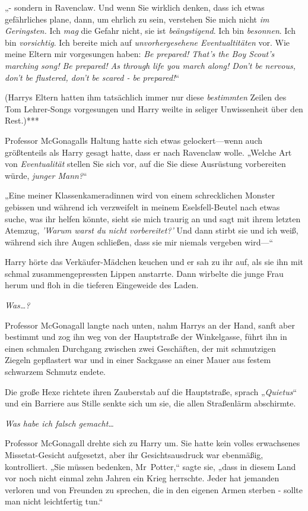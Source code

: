 {„- sondern in Ravenclaw. Und wenn Sie wirklich denken, dass ich etwas gefährliches plane, dann, um ehrlich zu sein, verstehen Sie mich nicht \emph{im Geringsten.} Ich \emph{mag} die Gefahr nicht, sie ist \emph{beängstigend}. Ich bin \emph{besonnen}. Ich bin \emph{vorsichtig}. Ich bereite mich auf \emph{unvorhergesehene Eventualtitäten} vor. Wie meine Eltern mir vorgesungen haben: \emph{Be prepared! That's the Boy Scout's marching song! Be prepared! As through life you march along! Don't be nervous, don't be flustered, don't be scared - be prepared!}“

(Harrys Eltern hatten ihm tatsächlich immer nur diese \emph{bestimmten} Zeilen des Tom Lehrer-Songs vorgesungen und Harry weilte in seliger Unwissenheit über den Rest.)***

Professor McGonagalls Haltung hatte sich etwas gelockert—wenn auch größtenteils als Harry gesagt hatte, dass er nach Ravenclaw wolle. „Welche Art von \emph{Eventualität} stellen Sie sich vor, auf die Sie diese Ausrüstung vorbereiten würde, \emph{junger Mann?}“

„Eine meiner Klassenkameradinnen wird von einem schrecklichen Monster gebissen und während ich verzweifelt in meinem Eselsfell-Beutel nach etwas suche, was ihr helfen könnte, sieht sie mich traurig an und sagt mit ihrem letzten Atemzug, \emph{'Warum warst du nicht vorbereitet?'} Und dann stirbt sie und ich weiß, während sich ihre Augen schließen, dass sie mir niemals vergeben wird—“

Harry hörte das Verkäufer-Mädchen keuchen und er sah zu ihr auf, als sie ihn mit schmal zusammengepressten Lippen anstarrte. Dann wirbelte die junge Frau herum und floh in die tieferen Eingeweide des Laden.

\emph{Was…?}

Professor McGonagall langte nach unten, nahm Harrys an der Hand, sanft aber bestimmt und zog ihn weg von der Hauptstraße der Winkelgasse, führt ihn in einen schmalen Durchgang zwischen zwei Geschäften, der mit schmutzigen Ziegeln gepflastert war und in einer Sackgasse an einer Mauer aus festem schwarzem Schmutz endete.

Die große Hexe richtete ihren Zauberstab auf die Hauptstraße, sprach „\emph{Quietus}“ und ein Barriere aus Stille senkte sich um sie, die allen Straßenlärm abschirmte.

\emph{Was habe ich falsch gemacht…}

Professor McGonagall drehte sich zu Harry um. Sie hatte kein volles erwachsenes Missetat-Gesicht aufgesetzt, aber ihr Gesichtsausdruck war ebenmäßig, kontrolliert. „Sie müssen bedenken, Mr~Potter,“ sagte sie, „dass in diesem Land vor noch nicht einmal zehn Jahren ein Krieg herrschte. Jeder hat jemanden verloren und von Freunden zu sprechen, die in den eigenen Armen sterben - sollte man nicht leichtfertig tun.“

}
